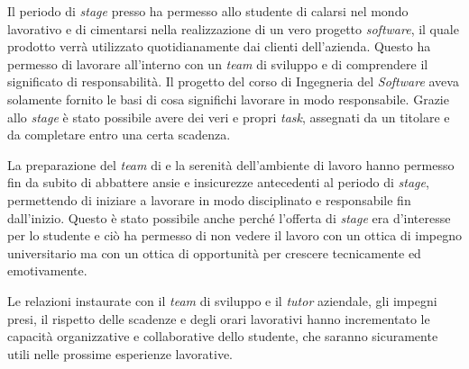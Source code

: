 Il periodo di \textit{stage} presso \visione{} ha permesso allo studente di calarsi nel mondo lavorativo e di cimentarsi nella realizzazione di un vero progetto \textit{software}, il quale prodotto verrà utilizzato quotidianamente dai clienti dell'azienda. Questo ha permesso di lavorare all'interno con un \textit{team} di sviluppo e di comprendere il significato di responsabilità. Il progetto del corso di Ingegneria del \textit{Software} aveva solamente fornito le basi di cosa significhi lavorare in modo responsabile. Grazie allo \textit{stage} è stato possibile avere dei veri e propri \textit{task}, assegnati da un titolare e da completare entro una certa scadenza.

La preparazione del \textit{team} di \visione{} e la serenità dell'ambiente di lavoro hanno permesso fin da subito di abbattere ansie e insicurezze antecedenti al periodo di \textit{stage}, permettendo di iniziare a lavorare in modo disciplinato e responsabile fin dall'inizio. Questo è stato possibile anche perché l'offerta di \textit{stage} era d'interesse per lo studente e ciò ha permesso di non vedere il lavoro con un ottica di impegno universitario ma con un ottica di opportunità per crescere tecnicamente ed emotivamente.

Le relazioni instaurate con il \textit{team} di sviluppo e il \textit{tutor} aziendale, gli impegni presi, il rispetto delle scadenze e degli orari lavorativi hanno incrementato le capacità organizzative e collaborative dello studente, che saranno sicuramente utili nelle prossime esperienze lavorative.